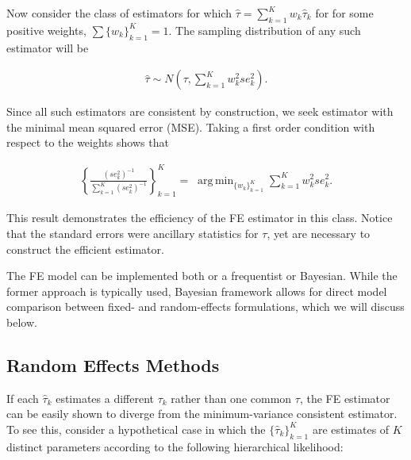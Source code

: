 \documentclass[12pt]{article}
\DeclareMathOperator*{\argmin}{arg\,min}
\begin{document}
Now consider the class of estimators for which $\hat{\tau} = \sum_{k=1}^{K} w_k \hat{\tau}_k$ for 
for some positive weights, $\sum \{w_k\}_{k=1}^K =1$.
The sampling distribution of any such estimator will be

\begin{equation}
\begin{aligned}
\hat{\tau} \sim N(\tau, \sum_{k=1}^{K} w_k^2 se^2_{k}) .
\end{aligned}
\end{equation}

Since all such estimators are consistent by construction, we seek estimator with the minimal mean squared error (MSE). Taking a first order condition with respect to the weights shows that

 \begin{equation}\label{fe}
\begin{aligned}
\left\{ \frac{(se^2_k)^{-1}}{\sum_{k=1}^K(se^2_k)^{-1}} \right\}_{k=1}^K = \; \argmin_{ \{w_k\}_{k=1}^K  } \sum_{k=1}^{K} w_k^2 se^2_{k}.
\end{aligned}
\end{equation}

This result demonstrates the efficiency of the FE estimator in this class. Notice that the standard errors were ancillary statistics for $\tau$, yet are necessary to construct the efficient estimator. 

The FE model can be implemented both or a frequentist or Bayesian. While the former approach is typically used, Bayesian framework allows for direct model comparison between fixed- and random-effects formulations, which we will discuss below. 



\subsection{Random Effects Methods}


If each $\hat{\tau}_k$ estimates a different $\tau_k$ rather than one common $\tau$, the FE estimator can be easily shown to diverge from the minimum-variance consistent estimator. To see this, consider a hypothetical case in which the $\{\hat{\tau}_k\}_{k=1}^K$ are estimates of $K$ distinct parameters according to the following hierarchical likelihood:
\end{document}
